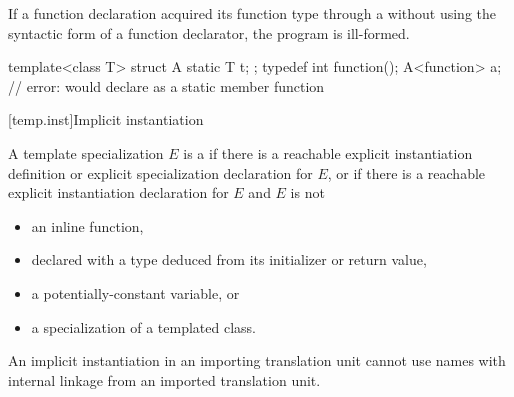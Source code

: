 \pnum
If a function declaration acquired its function type through
a  without using the syntactic form of
a function declarator, the program is ill-formed.
\begin{example}
\begin{codeblock}
template<class T> struct A {
  static T t;
};
typedef int function();
A<function> a;      // error: would declare  as a static member function
\end{codeblock}
\end{example}

[temp.inst]{Implicit instantiation}

\pnum
A template specialization $E$ is a 
if there is a reachable
explicit instantiation definition or
explicit specialization declaration
for $E$, or
if there is a reachable explicit instantiation declaration for $E$ and
$E$ is not
\begin{itemize}
\item
an inline function,
\item
declared with a type deduced
from its initializer or return value,
\item
a potentially-constant variable, or
\item
a specialization of a templated class.
\end{itemize}
\begin{note}
An implicit instantiation in an importing translation unit
cannot use names with internal linkage
from an imported translation unit.
\end{note}

